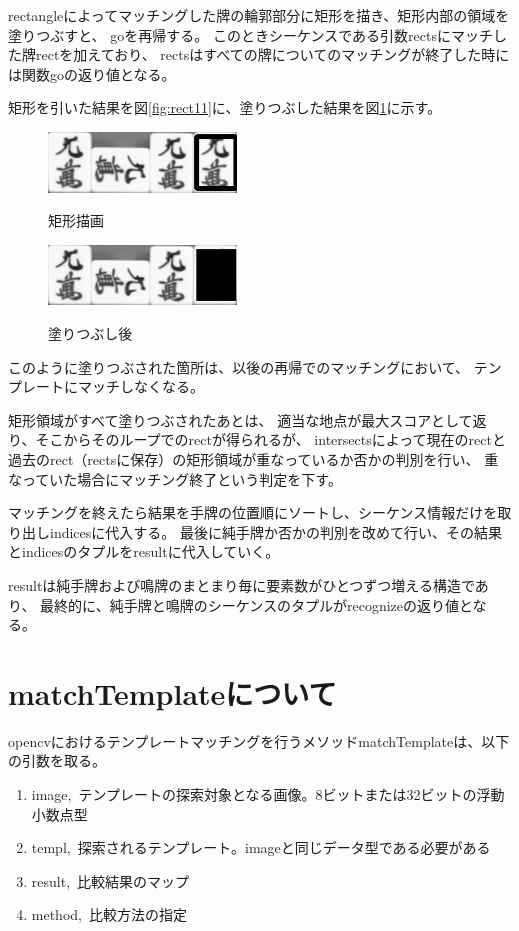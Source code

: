 \documentclass{jsarticle}
\begin{document}
\begin{multicols}{2}
rectangleによってマッチングした牌の輪郭部分に矩形を描き、矩形内部の領域を塗りつぶすと、
goを再帰する。
このときシーケンスである引数rectsにマッチした牌rectを加えており、
rectsはすべての牌についてのマッチングが終了した時には関数goの返り値となる。

矩形を引いた結果を図\ref{fig:rect11}に、塗りつぶした結果を図\ref{fig:hand11}に示す。

\begin{figure}[H]
  \begin{center}
    \includegraphics[clip,width=5.0cm]{./img/hand_rect1_1.png}
    \caption{矩形描画}
    \label{fig:rect11}
    \includegraphics[clip,width=5.0cm]{./img/hand1_1.png}
    \caption{塗りつぶし後}
    \label{fig:hand11}
  \end{center}
\end{figure}

このように塗りつぶされた箇所は、以後の再帰でのマッチングにおいて、
テンプレートにマッチしなくなる。

矩形領域がすべて塗りつぶされたあとは、
適当な地点が最大スコアとして返り、そこからそのループでのrectが得られるが、
intersectsによって現在のrectと過去のrect（rectsに保存）の矩形領域が重なっているか否かの判別を行い、
重なっていた場合にマッチング終了という判定を下す。

マッチングを終えたら結果を手牌の位置順にソートし、シーケンス情報だけを取り出しindicesに代入する。
最後に純手牌か否かの判別を改めて行い、その結果とindicesのタプルをresultに代入していく。

resultは純手牌および鳴牌のまとまり毎に要素数がひとつずつ増える構造であり、
最終的に、純手牌と鳴牌のシーケンスのタプルがrecognizeの返り値となる。

\section{matchTemplateについて}

opencvにおけるテンプレートマッチングを行うメソッドmatchTemplateは、以下の引数を取る。
\begin{enumerate}
\item image,\ テンプレートの探索対象となる画像。8ビットまたは32ビットの浮動小数点型
\item templ,\ 探索されるテンプレート。imageと同じデータ型である必要がある
\item result,\ 比較結果のマップ
\item method,\ 比較方法の指定
\end{enumerate}


\end{multicols}
\end{document}
